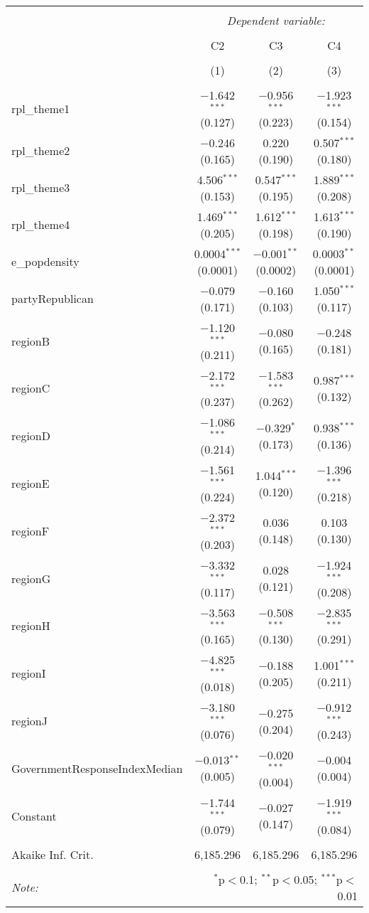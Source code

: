 
\begin{table}[!htbp] \centering 
  \caption{} 
  \label{} 
\begin{tabular}{@{\extracolsep{5pt}}lccc} 
\\[-1.8ex]\hline 
\hline \\[-1.8ex] 
 & \multicolumn{3}{c}{\textit{Dependent variable:}} \\ 
\cline{2-4} 
\\[-1.8ex] & C2 & C3 & C4 \\ 
\\[-1.8ex] & (1) & (2) & (3)\\ 
\hline \\[-1.8ex] 
 rpl\_theme1 & $-$1.642$^{***}$ (0.127) & $-$0.956$^{***}$ (0.223) & $-$1.923$^{***}$ (0.154) \\ 
  rpl\_theme2 & $-$0.246 (0.165) & 0.220 (0.190) & 0.507$^{***}$ (0.180) \\ 
  rpl\_theme3 & 4.506$^{***}$ (0.153) & 0.547$^{***}$ (0.195) & 1.889$^{***}$ (0.208) \\ 
  rpl\_theme4 & 1.469$^{***}$ (0.205) & 1.612$^{***}$ (0.198) & 1.613$^{***}$ (0.190) \\ 
  e\_popdensity & 0.0004$^{***}$ (0.0001) & $-$0.001$^{**}$ (0.0002) & 0.0003$^{**}$ (0.0001) \\ 
  partyRepublican & $-$0.079 (0.171) & $-$0.160 (0.103) & 1.050$^{***}$ (0.117) \\ 
  regionB & $-$1.120$^{***}$ (0.211) & $-$0.080 (0.165) & $-$0.248 (0.181) \\ 
  regionC & $-$2.172$^{***}$ (0.237) & $-$1.583$^{***}$ (0.262) & 0.987$^{***}$ (0.132) \\ 
  regionD & $-$1.086$^{***}$ (0.214) & $-$0.329$^{*}$ (0.173) & 0.938$^{***}$ (0.136) \\ 
  regionE & $-$1.561$^{***}$ (0.224) & 1.044$^{***}$ (0.120) & $-$1.396$^{***}$ (0.218) \\ 
  regionF & $-$2.372$^{***}$ (0.203) & 0.036 (0.148) & 0.103 (0.130) \\ 
  regionG & $-$3.332$^{***}$ (0.117) & 0.028 (0.121) & $-$1.924$^{***}$ (0.208) \\ 
  regionH & $-$3.563$^{***}$ (0.165) & $-$0.508$^{***}$ (0.130) & $-$2.835$^{***}$ (0.291) \\ 
  regionI & $-$4.825$^{***}$ (0.018) & $-$0.188 (0.205) & 1.001$^{***}$ (0.211) \\ 
  regionJ & $-$3.180$^{***}$ (0.076) & $-$0.275 (0.204) & $-$0.912$^{***}$ (0.243) \\ 
  GovernmentResponseIndexMedian & $-$0.013$^{**}$ (0.005) & $-$0.020$^{***}$ (0.004) & $-$0.004 (0.004) \\ 
  Constant & $-$1.744$^{***}$ (0.079) & $-$0.027 (0.147) & $-$1.919$^{***}$ (0.084) \\ 
 \hline \\[-1.8ex] 
Akaike Inf. Crit. & 6,185.296 & 6,185.296 & 6,185.296 \\ 
\hline 
\hline \\[-1.8ex] 
\textit{Note:}  & \multicolumn{3}{r}{$^{*}$p$<$0.1; $^{**}$p$<$0.05; $^{***}$p$<$0.01} \\ 
\end{tabular} 
\end{table} 

